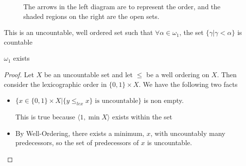 \begin{figure}[h]
    \caption{The arrows in the left diagram are to represent the order, and the shaded regions on the right are the open sets.}
\end{figure}

\begin{example}
    This is an uncountable, well ordered set such that $\forall\alpha\in\omega_1$, the set $\{\gamma\vert\gamma<\alpha\}$ is countable
\end{example}
\begin{theorem}
    $\omega_1$ exists
\end{theorem}
\begin{proof}
    Let $X$ be an uncountable set and let $\leq$ be a well ordering on $X$. Then consider the lexicographic order in $\{0,1\}\times X$. We have the following two facts
    \begin{itemize}
        \item $\{x\in\{0,1\}\times X\vert \{y\leq_{lex}x\}\text{ is uncountable}\}$ is non empty.
        
        This is true because $\langle 1,\min X\rangle$ exists within the set

        \item By Well-Ordering, there exists a minimum, $x$, with uncountably many predecessors, so the set of predecessors of $x$ is uncountable.
    \end{itemize}
\end{proof}
